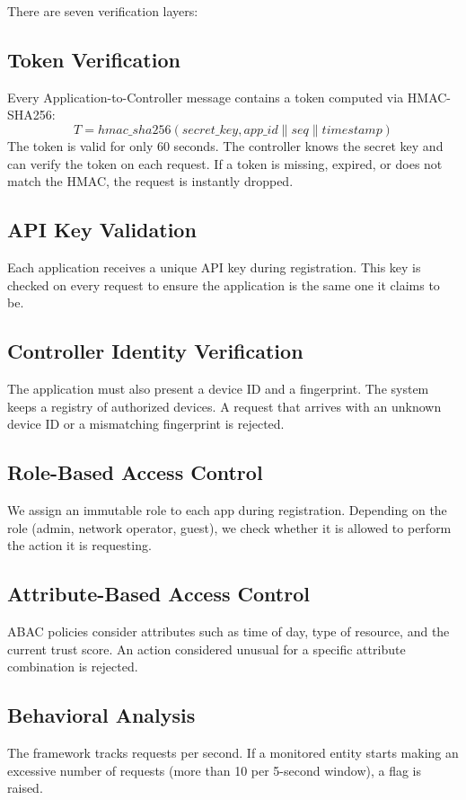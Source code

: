 \documentclass[conference]{IEEEtran}
\begin{document}
There are seven verification layers:

\subsection{Token Verification}
Every Application-to-Controller message contains a token computed via HMAC-SHA256:
\begin{equation}
T = hmac\_sha256(secret\_key, app\_id \| seq \| timestamp)
\end{equation}
The token is valid for only 60 seconds. The controller knows the secret key and can verify the token on each request. If a token is missing, expired, or does not match the HMAC, the request is instantly dropped.

\subsection{API Key Validation}
Each application receives a unique API key during registration. This key is checked on every request to ensure the application is the same one it claims to be.

\subsection{Controller Identity Verification}
The application must also present a device ID and a fingerprint. The system keeps a registry of authorized devices. A request that arrives with an unknown device ID or a mismatching fingerprint is rejected.

\subsection{Role-Based Access Control}
We assign an immutable role to each app during registration. Depending on the role (admin, network operator, guest), we check whether it is allowed to perform the action it is requesting.

\subsection{Attribute-Based Access Control}
ABAC policies consider attributes such as time of day, type of resource, and the current trust score. An action considered unusual for a specific attribute combination is rejected.

\subsection{Behavioral Analysis}
The framework tracks requests per second. If a monitored entity starts making an excessive number of requests (more than 10 per 5-second window), a flag is raised.
\end{document}
